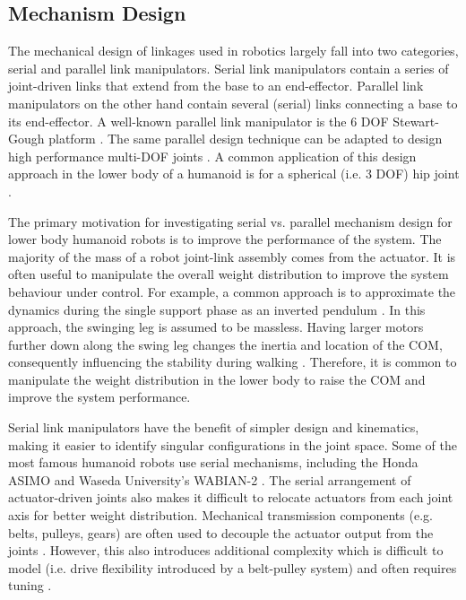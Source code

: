 

\subsection{Mechanism Design} %
\label{sub:related_mechanism_design}
The mechanical design of linkages used in robotics largely fall into two categories, serial and parallel link manipulators. Serial link manipulators contain a series of joint-driven links that extend from the base to an end-effector. Parallel link manipulators on the other hand contain several (serial) links connecting a base to its end-effector. A well-known parallel link manipulator is the 6 DOF Stewart-Gough platform \cite{Dasgupta2000,Sugahara2005}. The same parallel design technique can be adapted to design high performance multi-DOF joints \cite{Gosselin1994}. A common application of this design approach in the lower body of a humanoid is for a spherical (i.e. 3 DOF) hip joint \cite{Hofschulte2005}. 

The primary motivation for investigating serial vs. parallel mechanism design for lower body humanoid robots is to improve the performance of the system. The majority of the mass of a robot joint-link assembly comes from the actuator. It is often useful to manipulate the overall weight distribution to improve the system behaviour under control. For example, a common approach is to approximate the dynamics during the single support phase as an inverted pendulum \cite{Kajita1992}. In this approach, the swinging leg is assumed to be massless. Having larger motors further down along the swing leg changes the inertia and location of the COM, consequently influencing the stability during walking \cite{Morisawa2000}. Therefore, it is common to manipulate the weight distribution in the lower body to raise the COM and improve the system performance. 

Serial link manipulators have the benefit of simpler design and kinematics, making it easier to identify singular configurations in the joint space. Some of the most famous humanoid robots use serial mechanisms, including the Honda ASIMO \cite{Sakagami:2002cf} and Waseda University's WABIAN-2 \cite{Ogura:2006bm}. The serial arrangement of actuator-driven joints also makes it difficult to relocate actuators from each joint axis for better weight distribution. Mechanical transmission components (e.g. belts, pulleys, gears) are often used to decouple the actuator output from the joints \cite{Ogura:2006bm}. However, this also introduces additional complexity which is difficult to model (i.e. drive flexibility introduced by a belt-pulley system) and often requires tuning \cite{IllWooPark:2005et}. 

